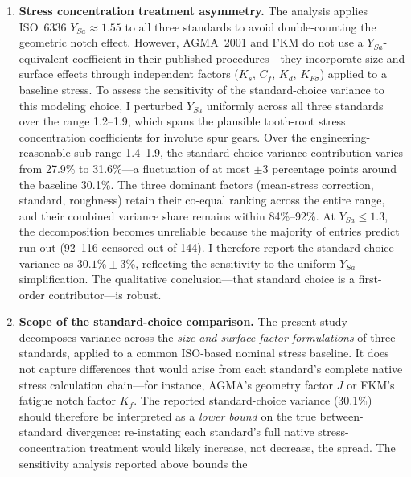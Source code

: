 \documentclass[12pt,a4paper]{article}
\begin{document}
\begin{enumerate}
  \item \textbf{Stress concentration treatment asymmetry.} The analysis
        applies ISO~6336 $Y_{Sa} \approx 1.55$ to all three standards to
        avoid double-counting the geometric notch effect. However, AGMA~2001
        and FKM do not use a $Y_{Sa}$-equivalent coefficient in their
        published procedures---they incorporate size and surface effects
        through independent factors ($K_s$, $C_f$, $K_d$, $K_{F\sigma}$)
        applied to a baseline stress. To assess the sensitivity of the
        standard-choice variance to this modeling choice, I perturbed
        $Y_{Sa}$ uniformly across all three standards over the range
        1.2--1.9, which spans the plausible tooth-root stress
        concentration coefficients for involute spur gears. Over the
        engineering-reasonable sub-range 1.4--1.9, the standard-choice
        variance contribution varies from 27.9\% to 31.6\%---a
        fluctuation of at most $\pm$3 percentage points around the
        baseline 30.1\%. The three dominant factors (mean-stress
        correction, standard, roughness) retain their co-equal ranking
        across the entire range, and their combined variance share
        remains within 84\%--92\%. At $Y_{Sa} \leq 1.3$, the
        decomposition becomes unreliable because the majority of
        entries predict run-out (92--116 censored out of 144). I
        therefore report the standard-choice variance as
        $30.1\% \pm 3\%$, reflecting the sensitivity to the uniform
        $Y_{Sa}$ simplification. The qualitative conclusion---that
        standard choice is a first-order contributor---is robust.%
  \item \textbf{Scope of the standard-choice comparison.} The present study
        decomposes variance across the \emph{size-and-surface-factor
        formulations} of three standards, applied to a common ISO-based
        nominal stress baseline. It does not capture differences that would
        arise from each standard's complete native stress calculation
        chain---for instance, AGMA's geometry factor $J$ or FKM's fatigue
        notch factor $K_f$. The reported standard-choice variance (30.1\%)
        should therefore be interpreted as a \emph{lower bound} on the true
        between-standard divergence: re-instating each standard's full native
        stress-concentration treatment would likely increase, not decrease,
        the spread. The sensitivity analysis reported above bounds the

\end{enumerate}
\end{document}
